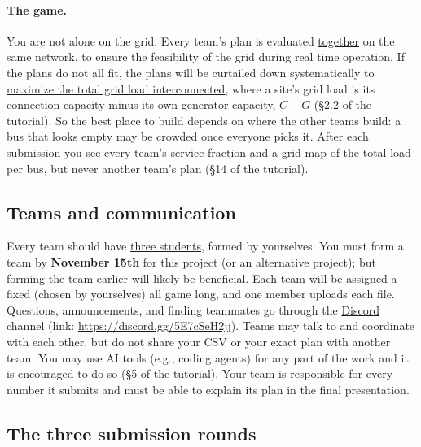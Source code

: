 \documentclass[10pt]{article}
\newcommand{\alert}[1]{{\color{alertblue}\uline{#1}}}
\newcommand{\code}[1]{\path{#1}}
\newcommand{\assignsection}[2]{\subsection*{#1}}
\begin{document}
\paragraph{The game.} You are not alone on the grid. Every team's plan is
evaluated \alert{together} on the same network, to ensure the feasibility of
the grid during real time operation. If the plans do not all fit, the plans
will be curtailed down systematically to \alert{maximize the total grid load
interconnected}, where a site's grid load is its connection capacity minus its
own generator capacity, $C - G$ (\S2.2 of the tutorial). So the best place to build depends on
where the other teams build: a bus that looks empty may be crowded once
everyone picks it. After each submission you see every team's service fraction
and a grid map of the total load per bus, but never another team's plan
(\S14 of the tutorial).

\assignsection{Teams and communication}{asg:team}

Every team should have \alert{three students}, formed by yourselves. You must form a team by {\bf November 15th} for this project (or an alternative project); but forming the team earlier will likely be beneficial. Each team
will be assigned a fixed \code{team_id} (chosen by yourselves) all game long,
and one member uploads each file. Questions, announcements, and finding
teammates go through the \alert{Discord} channel (link:
\url{https://discord.gg/5E7cSeH2jj}). Teams may talk to and coordinate with each
other, but do not share your CSV or your exact plan with another team. You may
use AI tools (e.g., coding agents) for any part of the work and it is
encouraged to do so (\S5 of the tutorial). Your team is responsible for every number
it submits and must be able to explain its plan in the final presentation.

\assignsection{The three submission rounds}{asg:rules}
\end{document}
